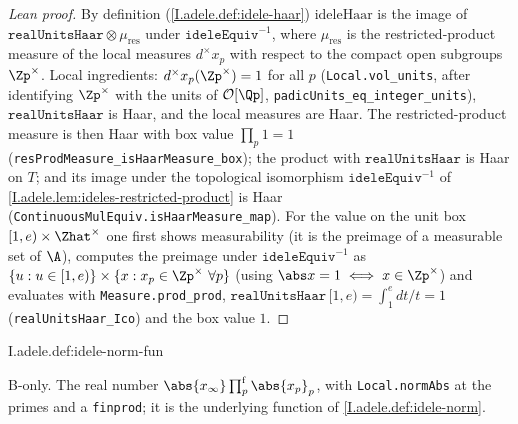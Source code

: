 \begin{proof}[Lean proof]
By definition (\cref{I.adele.def:idele-haar}) $\mathrm{ideleHaar}$ is the image of $\mathtt{realUnitsHaar}\otimes\mu_{\mathrm{res}}$ under $\texttt{ideleEquiv}^{-1}$, where $\mu_{\mathrm{res}}$ is the restricted-product measure of the local measures $d^\times x_p$ with respect to the compact open subgroups $\Zp^\times$. Local ingredients: $d^\times x_p(\Zp^\times)=1$ for all $p$ (\texttt{Local.vol\_units}, after identifying $\Zp^\times$ with the units of $\mathcal O[\Qp]$, \texttt{padicUnits\_eq\_integer\_units}), $\mathtt{realUnitsHaar}$ is Haar, and the local measures are Haar. The restricted-product measure is then Haar with box value $\prod_p 1=1$ (\texttt{resProdMeasure\_isHaarMeasure\_box}); the product with $\mathtt{realUnitsHaar}$ is Haar on $T$; and its image under the topological isomorphism $\texttt{ideleEquiv}^{-1}$ of \cref{I.adele.lem:ideles-restricted-product} is Haar (\texttt{ContinuousMulEquiv.isHaarMeasure\_map}). For the value on the unit box $[1,e)\times\Zhat^\times$ one first shows measurability (it is the preimage of a measurable set of $\A$), computes the preimage under $\texttt{ideleEquiv}^{-1}$ as $\{u: u\in[1,e)\}\times\{x:x_p\in\Zp^\times\ \forall p\}$ (using $\abs x=1\iff x\in\Zp^\times$) and evaluates with \texttt{Measure.prod\_prod}, $\mathtt{realUnitsHaar}\,[1,e)=\int_1^e dt/t=1$ (\texttt{realUnitsHaar\_Ico}) and the box value $1$.
\end{proof}

\begin{definition}
\bonly
{}
\end{definition}
\begin{tfformal}{I.adele.def:idele-norm-fun}
\begin{tffidelity}
B-only. The real number $\abs{x_\infty}\prod^{\mathrm f}_p\abs{x_p}_p$, with \texttt{Local.normAbs} at the primes and a \texttt{finprod}; it is the underlying function of \cref{I.adele.def:idele-norm}.
\end{tffidelity}
\end{tfformal}


